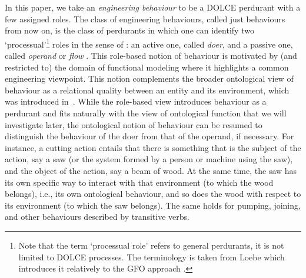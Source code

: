 \documentclass[sw]{iosart2x}
\newcommand{\DOLCE}{\textsc{DOLCE}\xspace} %
\newcommand{\firstTimeKeyWord}[1]{\textit{#1}}
\newcommand{\quotes}[1]{`#1'}
\begin{document}
\medskip
In this paper, we take an \firstTimeKeyWord{engineering behaviour} to be a \DOLCE perdurant with a few assigned roles. 
The class of engineering behaviours, called just behaviours from now on, is the class of perdurants in which one can identify two `processual'\footnote{Note that the term \quotes{processual role} refers to general perdurants, it is not limited to \DOLCE processes. The terminology is taken from Loebe which introduces it relatively to the GFO approach \cite{loebeAbstractVsSocial2007}.} roles in the sense of \cite{loebeAbstractVsSocial2007}: an active one, called \firstTimeKeyWord{doer}, and a passive one, called \firstTimeKeyWord{operand} or \firstTimeKeyWord{flow} \cite{pahl_engineering_2007}.
This role-based notion of behaviour is motivated by (and restricted to) the domain of functional modeling where it highlights a common engineering viewpoint. This notion complements the broader ontological view of behaviour as a relational quality between an entity and its environment, which was introduced in~\cite{borgoFormalOntologicalPerspective2009}.
While the role-based view introduces behaviour as a perdurant and fits naturally with the view of ontological function that we will investigate later, the ontological notion of behaviour can be resumed to distinguish the behaviour of the doer from that of the operand, if necessary.
For instance, a cutting action entails that there is something that is the subject of the action, say a saw (or the system formed by a person or machine using the saw), and the object of the action, say a beam of wood. At the same time, the saw has its own specific way to interact with that environment (to which the wood belongs), i.e., its own ontological behaviour, and so does the wood with respect to its environment (to which the saw belongs).
The same holds for pumping, joining, and other behaviours described by transitive verbs. 
\end{document}
